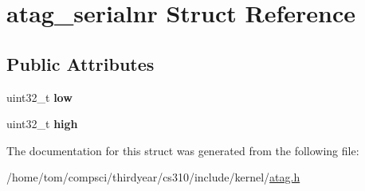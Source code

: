 \hypertarget{structatag__serialnr}{}\section{atag\+\_\+serialnr Struct Reference}
\label{structatag__serialnr}
\subsection*{Public Attributes}
\begin{DoxyCompactItemize}
\item 
\mbox{\label{structatag__serialnr_a3bc4227dff07f397f4557d1de3ac8332}} 
uint32\+\_\+t {\bfseries low}
\item 
\mbox{\label{structatag__serialnr_ab1c6c8e7b0b1517d5c95379763d09f2b}} 
uint32\+\_\+t {\bfseries high}
\end{DoxyCompactItemize}


The documentation for this struct was generated from the following file\+:\begin{DoxyCompactItemize}
\item 
/home/tom/compsci/thirdyear/cs310/include/kernel/\mbox{\hyperlink{atag_8h}{atag.\+h}}\end{DoxyCompactItemize}
